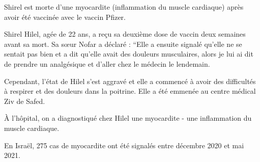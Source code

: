 Shirel est morte d'une myocardite (inflammation du muscle cardiaque) après avoir
été vaccinée avec le vaccin Pfizer.

Shirel Hilel, agée de 22 ans, a reçu sa deuxième dose de vaccin deux semaines
avant sa mort. Sa sœur Nofar a déclaré : “Elle a ensuite signalé qu'elle ne se
sentait pas bien et a dit qu'elle avait des douleurs musculaires, alors je lui
ai dit de prendre un analgésique et d'aller chez le médecin le lendemain.

Cependant, l'état de Hilel s'est aggravé et elle a commencé à avoir des
difficultés à respirer et des douleurs dans la poitrine. Elle a été emmenée au
centre médical Ziv de Safed.

À l'hôpital, on a diagnostiqué chez Hilel une myocardite - une inflammation du
muscle cardiaque.

En Israël, 275 cas de myocardite ont été signalés entre décembre 2020 et mai
2021.

